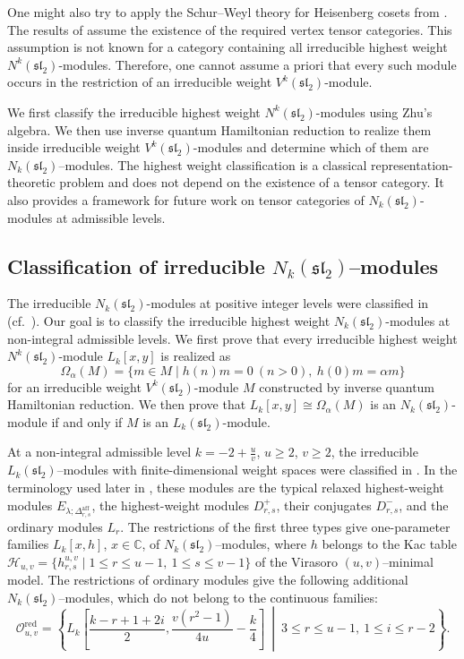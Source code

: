 \documentclass[11 pt]{amsart}
\theoremstyle{definition}
\theoremstyle{plain}
\begin{document}
One might also try to apply the Schur--Weyl theory for Heisenberg
cosets from \cite{CKLR}. The results of \cite{CKLR} assume the
existence of the required vertex tensor categories. This assumption
is not known for a category containing all irreducible highest weight
$N^k(\mathfrak{sl}_2)$-modules. Therefore, one cannot assume a priori that
every such module occurs in the restriction of an irreducible weight
$V^k(\mathfrak{sl}_2)$-module.

We first classify the irreducible highest weight
$N^k(\mathfrak{sl}_2)$-modules using Zhu's algebra. We then use
inverse quantum Hamiltonian reduction to realize them inside
irreducible weight $V^k(\mathfrak{sl}_2)$-modules and determine which
of them are $N_k(\mathfrak{sl}_2)$--modules. The highest weight
classification is a classical representation-theoretic problem and
does not depend on the existence of a tensor category. It also
provides a framework for future work on tensor categories of
$N_k(\mathfrak{sl}_2)$-modules at admissible levels.


\subsection*{Classification of irreducible
$N_k(\mathfrak{sl}_2)$--modules}

The irreducible $N_k(\mathfrak{sl}_2)$-modules at positive integer
levels were classified in \cite[Theorem~8.2]{ALY} (cf.\ \cite{DongRen}). Our goal is to
classify the irreducible highest weight
$N_k(\mathfrak{sl}_2)$-modules at non-integral admissible levels.
We first prove that every irreducible highest weight
$N^k(\mathfrak{sl}_2)$-module $L_k[x,y]$ is realized as
\[
\Omega_\alpha(M)=
\{m\in M\mid h(n)m=0\ (n>0),\ h(0)m=\alpha m\}
\]
for an irreducible weight $V^k(\mathfrak{sl}_2)$-module $M$ constructed
by inverse quantum Hamiltonian reduction. We then prove that
$L_k[x,y]\cong\Omega_\alpha(M)$ is an $N_k(\mathfrak{sl}_2)$-module if
and only if $M$ is an $L_k(\mathfrak{sl}_2)$-module.

At a non-integral admissible level $k=-2+\frac{u}{v}$, $u\ge 2$, $v\ge2$,
the irreducible $L_k(\mathfrak{sl}_2)$--modules with finite-dimensional
weight spaces were classified in \cite{AM95}.  In the terminology used later
in \cite{ACR}, these modules are the typical relaxed highest-weight modules
$E_{\lambda;\Delta^{\mathrm{aff}}_{r,s}}$, the highest-weight modules
$D^+_{r,s}$, their conjugates $D^-_{r,s}$, and the ordinary modules $L_r$.
The restrictions of the first three types give one-parameter families
$L_k[x,h]$, $x\in\mathbb C$, of $N_k(\mathfrak{sl}_2)$--modules,
where $h$ belongs to the Kac table
$\mathcal H_{u,v}=\{h^{u,v}_{r,s}\mid
1\le r\le u-1,\ 1\le s\le v-1\}$ of the Virasoro
$(u,v)$--minimal model.
The restrictions of ordinary modules give the following additional
$N_k(\mathfrak{sl}_2)$--modules, which do not belong to the continuous
families:
\begin{equation}
  \mathcal O^{\mathrm{red}}_{u,v}
  =
  \left\{
  L_k\left[
  \frac{k-r+1+2i}{2},
  \frac{v(r^2-1)}{4u}-\frac{k}{4}
  \right]
  \ \middle|\
  3\le r\le u-1,
  \ 1\le i\le r-2
  \right\}. \nonumber
\end{equation}
\end{document}
